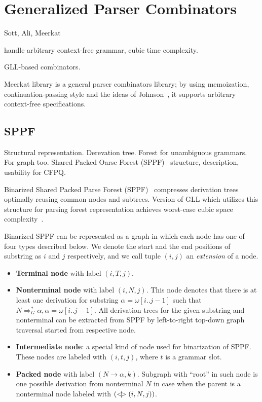 \section{Generalized Parser Combinators}

Sott, Ali, Meerkat

handle arbitrary context-free grammar, cubic time complexity.

GLL-based combinators.

Meerkat library is a general parser combinators library; by using memoization, continuation-passing style and the ideas of Johnson~\cite{Johnson}, it supports arbitrary context-free specifications. 


\subsection{SPPF}

Structural representation. 
Derevation tree.
Forest for unambiguous grammars.
For graph too.
Shared Packed Oarse Forest (SPPF)~\cite{SPPF} structure, description, usability for CFPQ.

Binarized Shared Packed Parse Forest (SPPF)~\cite{brnglr} compresses derivation trees optimally reusing common nodes and subtrees.
Version of GLL which utilizes this structure for parsing forest representation achieves worst-case cubic space complexity~\cite{gllParsingTree}.

Binarized SPPF can be represented as a graph in which each node has one of four types described below.
We denote the start and the end positions of substring as $i$ and $j$ respectively, and we call tuple $(i,j)$ an \textit{extension} of a node.

\begin{itemize}
    \item \textbf{Terminal node} with label $(i, T, j)$.
    \item \textbf{Nonterminal node} with label $(i, N, j)$. 
    This node denotes that there is at least one derivation for substring $\alpha=\omega[i..j-1]$ such that $N \Rightarrow^*_G \alpha, \alpha = \omega[i..j-1] $.
    All derivation trees for the given substring and nonterminal can be extracted from SPPF by left-to-right top-down graph traversal started from respective node.     
    \item \textbf{Intermediate node}: a special kind of node used for binarization of SPPF. These nodes are labeled with $(i,t,j)$, where $t$ is a grammar slot.
    \item \textbf{Packed node} with label $(N \rightarrow \alpha, k)$. 
    Subgraph with ``root'' in such node is one possible derivation from nonterminal $N$ in case when the parent is a nonterminal node labeled with $(<\mkern-9mu | \mkern-9mu> (i, N, j))$.

\end{itemize}

